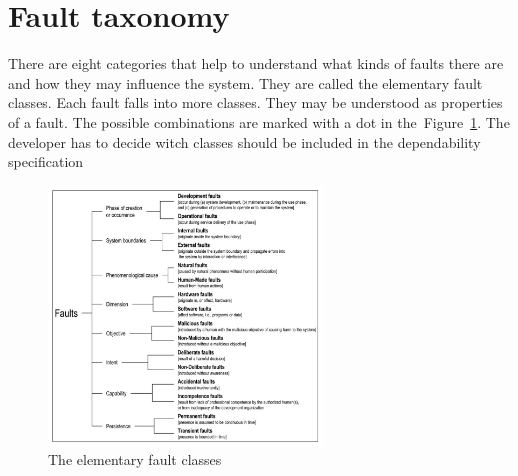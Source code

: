 \documentclass[]{myclass}
\begin{document}
\section{Fault taxonomy}
There are eight categories that help to understand what kinds of faults there are and how they may influence the system. They are called the elementary fault classes. Each fault falls into more classes. They may be understood as properties of a fault. The possible combinations are marked with a dot in the~{Figure~\ref*{fig:fault}}. The developer has to decide witch classes should be included in the dependability specification 

\begin  {figure}  [H]
\centering
\includegraphics[width=0.65\textwidth]{figures/fault.png}
\caption{The elementary fault classes~\cite{art:Avizienis}}
\label{fig:fault}
\end {figure}
\end{document}
